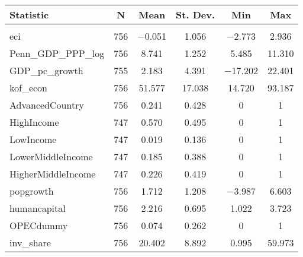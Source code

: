 
\begin{tabular}{@{\hspace{5pt}}lccccc} 
\toprule 
 
Statistic & \multicolumn{1}{c}{N} & \multicolumn{1}{c}{Mean} & \multicolumn{1}{c}{St. Dev.} & \multicolumn{1}{c}{Min} & \multicolumn{1}{c}{Max} \\ 
\midrule \\[-2.1ex] 
eci & 756 & $-$0.051 & 1.056 & $-$2.773 & 2.936 \\ 
Penn\_GDP\_PPP\_log & 756 & 8.741 & 1.252 & 5.485 & 11.310 \\ 
GDP\_pc\_growth & 755 & 2.183 & 4.391 & $-$17.202 & 22.401 \\ 
kof\_econ & 756 & 51.577 & 17.038 & 14.720 & 93.187 \\ 
AdvancedCountry & 756 & 0.241 & 0.428 & 0 & 1 \\ 
HighIncome & 747 & 0.570 & 0.495 & 0 & 1 \\ 
LowIncome & 747 & 0.019 & 0.136 & 0 & 1 \\ 
LowerMiddleIncome & 747 & 0.185 & 0.388 & 0 & 1 \\ 
HigherMiddleIncome & 747 & 0.226 & 0.419 & 0 & 1 \\ 
popgrowth & 756 & 1.712 & 1.208 & $-$3.987 & 6.603 \\ 
humancapital & 756 & 2.216 & 0.695 & 1.022 & 3.723 \\ 
OPECdummy & 756 & 0.074 & 0.262 & 0 & 1 \\ 
inv\_share & 756 & 20.402 & 8.892 & 0.995 & 59.973 \\ 
\bottomrule 
\end{tabular} 
